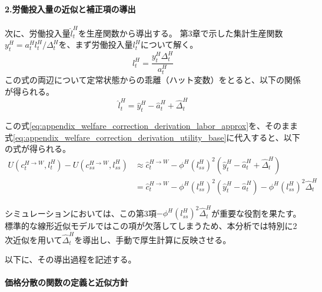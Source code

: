 \paragraph{2.労働投入量の近似と補正項の導出}\label{sec:appendix_welfare_correction_derivation_p2}

次に、労働投入量\(\hat{l}_t^H\)を生産関数から導出する。
第3章で示した集計生産関数\(y_t^H=a_t^Hl_t^H/\Delta_t^H\)を、まず労働投入量\(l_t^H\)について解く。
\begin{equation}
    l_t^H=\frac{y_t^H\Delta_t^H}{a_t^H}
\label{eq:appendix_welfare_correction_derivation_labor_def}
\end{equation}
この式の両辺について定常状態からの乖離（ハット変数）をとると、以下の関係が得られる。
\begin{equation}
    \hat{l}_t^H=\hat{y}_t^H-\hat{a}_t^H+\hat{\Delta}_t^H
\label{eq:appendix_welfare_correction_derivation_labor_approx}
\end{equation}

この式\eqref{eq:appendix_welfare_correction_derivation_labor_approx}を、そのまま式\eqref{eq:appendix_welfare_correction_derivation_utility_base}に代入すると、以下の式が得られる。
\begin{align}
    U(c_t^{H\to W},l_t^H)-U(c_{ss}^{H\to W},l_{ss}^H)&\approx\hat{c}_t^{H\to W}-\phi^H(l_{ss}^H)^2(\hat{y}_t^H-\hat{a}_t^H+\hat{\Delta}_t^H) \label{eq:appendix_welfare_correction_derivation_utility_combined_step1} \\
    &=\hat{c}_t^{H\to W}-\phi^H(l_{ss}^H)^2(\hat{y}_t^H-\hat{a}_t^H)-\phi^H(l_{ss}^H)^2\hat{\Delta}_t^H
\label{eq:appendix_welfare_correction_derivation_utility_combined}
\end{align}

シミュレーションにおいては、この第3項\(-\phi^H(l_{ss}^H)^2\hat{\Delta}_t^H\)が重要な役割を果たす。標準的な線形近似モデルではこの項が欠落してしまうため、本分析では特別に2次近似を用いて\(\hat{\Delta}_t^H\)を導出し、手動で厚生計算に反映させる。

以下に、その導出過程を記述する。

\paragraph{価格分散の関数の定義と近似方針}\label{sec:appendix_welfare_correction_derivation_disp_p1}

